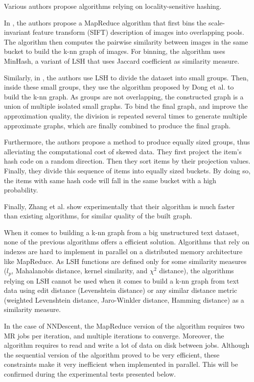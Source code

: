 \documentclass[wcp]{jmlr}
\begin{document}
Various authors propose algorithms relying on locality-sensitive hashing.

In \cite{Hsieh2012}, the authors propose a MapReduce algorithm that first bins the scale-invariant feature transform (SIFT) description of images into overlapping pools. The algorithm then computes the pairwise similarity between images in the same bucket to build the k-nn graph of images. For binning, the algorithm uses MinHash, a variant of LSH that uses Jaccard coefficient as similarity measure.

Similarly, in \cite{Zhang2013}, the authors use LSH to divide the dataset into small groups. Then, inside these small groups, they use the algorithm proposed by Dong et al. to build the k-nn graph. As groups are not overlapping, the constructed graph is a union of multiple isolated small graphs. To bind the final graph, and improve the approximation quality, the division is repeated several times to generate multiple approximate graphs, which are finally combined to produce the final graph.

Furthermore, the authors propose a method to produce equally sized groups, thus alleviating the computational cost of skewed data. They first project the item's hash code on a random direction. Then they sort items by their projection values. Finally, they divide this sequence of items into equally sized buckets. By doing so, the items with same hash code will fall in the same bucket with a high probability.

Finally, Zhang et al. show experimentally that their algorithm is much faster than existing algorithms, for similar quality of the built graph.

When it comes to building a k-nn graph from a big unstructured text dataset, none of the previous algorithms offers a efficient solution. Algorithms that rely on indexes are hard to implement in parallel on a distributed memory architecture like MapReduce. As LSH functions are defined only for some similarity measures ($l_p$, Mahalanobis distance, kernel similarity, and $\chi^2$ distance), the algorithms relying on LSH cannot be used when it comes to build a k-nn graph from text data using edit distance (Levenshtein distance) or any similar distance metric (weighted Levenshtein distance, Jaro-Winkler distance, Hamming distance) as a similarity measure.

In the case of NNDescent, the MapReduce version of the algorithm requires two MR jobs per iteration, and multiple iterations to converge. Moreover, the algorithm requires to read and write a lot of data on disk between jobs. Although the sequential version of the algorithm proved to be very efficient, these constraints make it very inefficient when implemented in parallel. This will be confirmed during the experimental tests presented below.
\end{document}

